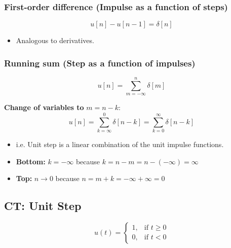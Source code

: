     \subsubsection{First-order difference (Impulse as a function of steps)}
    \begin{definition}
        \begin{equation}
            u[n] - u[n-1] = \delta [n]
        \end{equation}
        \begin{itemize}
            \item Analogous to derivatives.
        \end{itemize}
    \end{definition}

    \subsubsection{Running sum (Step as a function of impulses)}
    \begin{definition}
        \begin{equation}
            u[n] = \sum_{m=-\infty}^{n} \delta[m] 
        \end{equation}


        \noindent \textbf{Change of variables to} \(m = n - k \):
        \begin{equation}
            u[n] = \sum_{k=\infty}^{0} \delta[n-k] = \sum_{k=0}^{\infty} \delta[n-k]
        \end{equation}

        \begin{itemize}
            \item i.e. Unit step is a linear combination of the unit impulse functions.
            \item \textbf{Bottom:} $k=-\infty$ because $k = n - m = n - (-\infty) = \infty$
            \item \textbf{Top:} $n \rightarrow 0$ because $n = m + k = -\infty + \infty = 0$
        \end{itemize}

    \end{definition}

\subsection{CT: Unit Step}
\begin{definition}
    \begin{equation}
        u(t) =
        \begin{cases}
        1, & \text{if } t \geq 0 \\
        0, & \text{if } t < 0
        \end{cases}
    \end{equation}

\end{definition}


